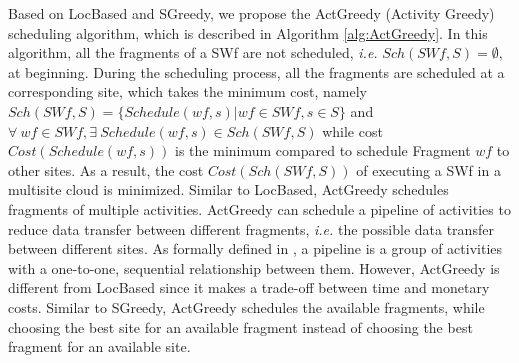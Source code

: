 Based on LocBased and SGreedy, we propose the ActGreedy (Activity Greedy) scheduling algorithm, which is described in Algorithm \ref{alg:ActGreedy}. 
In this algorithm, all the fragments of a SWf are not scheduled, \textit{i.e.} $Sch(SWf, S) = \emptyset$, at beginning. During the scheduling process, all the fragments are scheduled at a corresponding site, which takes the minimum cost, namely $Sch(SWf, S) = \{ Schedule(wf, s)| wf \in SWf, s \in S\}$ and $\forall ~wf \in SWf, \exists ~Schedule(wf, s) \in Sch(SWf, S)$ while cost $Cost(Schedule(wf, s))$ is the minimum compared to schedule Fragment $wf$ to other sites. As a result, the cost $Cost(Sch(SWf, S))$ of executing a SWf in a multisite cloud is minimized.
Similar to LocBased, ActGreedy schedules fragments of multiple activities. ActGreedy can schedule a pipeline of activities to reduce data transfer between different fragments, \textit{i.e.} the possible data transfer between different sites. As formally defined in \cite{Rodriguez2015}, a pipeline is a group of activities with a one-to-one, sequential relationship between them. However, ActGreedy is different from LocBased since it makes a trade-off between time and monetary costs. Similar to SGreedy, ActGreedy schedules the available fragments, while choosing the best site for an available fragment instead of choosing the best fragment for an available site.

